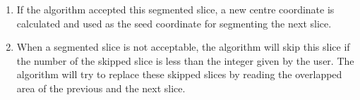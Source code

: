 \documentclass[letterpaper,10pt,english]{sphinxmanual}
\begin{document}
\begin{enumerate}
\begin{quote}
\begin{sphinxadmonition}{note}{Note:}
\sphinxAtStartPar
To determine whether a segmented slice is acceptable, different conditions are verified for {\hyperref[\detokenize{glossary:term-Descending-Aorta}]{}} and {\hyperref[\detokenize{glossary:term-Ascending-Aorta}]{}}. These conditions check are all involved with the {\hyperref[\detokenize{glossary:term-Qualified-coefficient}]{}}, which is decided by the user. In simple terms, the larger the {\hyperref[\detokenize{glossary:term-Qualified-coefficient}]{}}, the looser condition on accepting a segmented slice.
\end{sphinxadmonition}
\end{quote}

\item {} 
\sphinxAtStartPar
If the algorithm accepted this segmented slice, a new centre coordinate is calculated and used as the seed coordinate for segmenting the next slice.

\item {} 
\sphinxAtStartPar
When a segmented slice is not acceptable, the algorithm will skip this slice if the number of the skipped slice is less than the integer given by the user. The algorithm will try to replace these skipped slices by reading the overlapped area of the previous and the next slice.

\end{enumerate}
\end{document}
